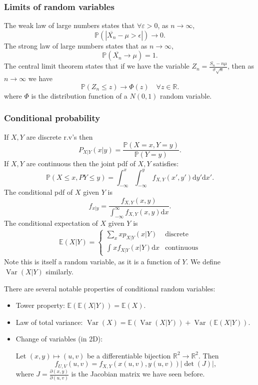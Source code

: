 \documentclass[egregdoesnotlikesansseriftitles,a4paper]{scrartcl}
\begin{document}
\subsubsection*{Limits of random variables}
The weak law of large numbers states that $\forall \varepsilon >0$, as $n \rightarrow \infty$, \[
\mathbb{P} \left(|\overline{X_n} -\mu > \epsilon|\right) \rightarrow 0
.\] 
The strong law of large numbers states that as $n \rightarrow \infty$, \[
\mathbb{P}(\overline{X_{n}} \rightarrow \mu)=1
.\] The central limit theorem states that if we have the variable $Z_{n}= \frac{S_{n}-n \mu}{\sigma \sqrt{n}}$, then as $n \rightarrow \infty$ we have \[
\mathbb{P}(Z_{n} \leq z) \rightarrow \Phi (z) \quad \forall z \in \mathbb{R}
.\] where $\Phi$ is the distribution function of a $N (0,1)$ random variable.  
\subsubsection*{Conditional probability}
\begin{definition*}
     If $X,Y$ are discrete r.v's then \[
     P_{X|Y}(x|y)= \frac{\mathbb{P}(X=x, Y=y)}{\mathbb{P}(Y=y)}
     .\]   
     If $X,Y$ are continuous then the joint pdf of $X,Y$ satisfies: \[
     \mathbb{P}(X \leq x, P Y \leq y)=\int_{- \infty}^{x}\int_{- \infty}^{y}f_{X,Y} (x',y')\mathrm{d}y'  \mathrm{d}x' 
     .\] 
     The conditional pdf of $X$ given $Y$ is \[
     f_{x|y}= \frac{f_{X,Y}(x,y)}{\int_{- \infty}^{ \infty}f_{X,Y}(x,y) \mathrm{d}x }
     .\] 
     The conditional expectation of $X$ given $Y$ is 
     \begin{align*}
          \mathbb{E}(X|Y)=
          \begin{cases}
               \sum_{x}^{}xp_{X|Y}(x|Y) & \text{discrete}\\
               \int_{}^{}x f_{X|Y}(x|Y) \mathrm{d}x & \text{continuous}
          \end{cases}
     \end{align*}
     Note this is itself a random variable, as it is a function of $Y$. We define $\operatorname{Var}(X|Y)$ similarly. 
\end{definition*}
There are several notable properties of conditional random variables:
\begin{itemize}
     \item Tower property: $\mathbb{E}(\mathbb{E}(X|Y))=\mathbb{E}(X)$.
     \item Law of total variance: $\operatorname{Var}(X)=\mathbb{E}(\operatorname{Var}(X|Y))+\operatorname{Var}(\mathbb{E}(X|Y))$. 
     \item Change of variables (in 2D):

     Let $(x,y) \mapsto (u,v)$ be a differentiable bijection $\mathbb{R}^{2} \rightarrow \mathbb{R}^{2} $. Then \[
     f_{U,V}(u,v)=f_{X,Y}(x (u,v),y (u,v))|\det (J)|
     ,\] where $J=\frac{\partial (x,y)}{\partial (u,v)}$ is the Jacobian matrix we have seen before. 
\end{itemize}
\end{document}
